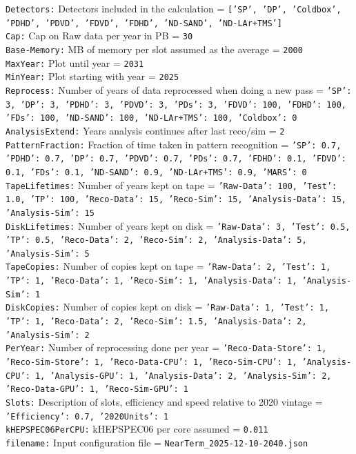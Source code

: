 {\tt Detectors:} Detectors included in the calculation = {\tt ['SP', 'DP', 'Coldbox', 'PDHD', 'PDVD', 'FDVD', 'FDHD', 'ND-SAND', 'ND-LAr+TMS']} \\
{\tt Cap:} Cap on Raw data per year in PB = {\tt 30} \\
{\tt Base-Memory:} MB of memory per slot assumed as the average = {\tt 2000} \\
{\tt MaxYear:} Plot until year = {\tt 2031} \\
{\tt MinYear:} Plot starting with year = {\tt 2025} \\
{\tt Reprocess:} Number of years of data reprocessed when doing a new pass = {\tt {'SP': 3, 'DP': 3, 'PDHD': 3, 'PDVD': 3, 'PDs': 3, 'FDVD': 100, 'FDHD': 100, 'FDs': 100, 'ND-SAND': 100, 'ND-LAr+TMS': 100, 'Coldbox': 0}} \\
{\tt AnalysisExtend:} Years analysis continues after last reco/sim = {\tt 2} \\
{\tt PatternFraction:} Fraction of time taken in pattern recognition = {\tt {'SP': 0.7, 'PDHD': 0.7, 'DP': 0.7, 'PDVD': 0.7, 'PDs': 0.7, 'FDHD': 0.1, 'FDVD': 0.1, 'FDs': 0.1, 'ND-SAND': 0.9, 'ND-LAr+TMS': 0.9, 'MARS': 0}} \\
{\tt TapeLifetimes:} Number of years kept on tape = {\tt {'Raw-Data': 100, 'Test': 1.0, 'TP': 100, 'Reco-Data': 15, 'Reco-Sim': 15, 'Analysis-Data': 15, 'Analysis-Sim': 15}} \\
{\tt DiskLifetimes:} Number of years kept on disk = {\tt {'Raw-Data': 3, 'Test': 0.5, 'TP': 0.5, 'Reco-Data': 2, 'Reco-Sim': 2, 'Analysis-Data': 5, 'Analysis-Sim': 5}} \\
{\tt TapeCopies:} Number of copies kept on tape = {\tt {'Raw-Data': 2, 'Test': 1, 'TP': 1, 'Reco-Data': 1, 'Reco-Sim': 1, 'Analysis-Data': 1, 'Analysis-Sim': 1}} \\
{\tt DiskCopies:} Number of copies kept on disk = {\tt {'Raw-Data': 1, 'Test': 1, 'TP': 1, 'Reco-Data': 2, 'Reco-Sim': 1.5, 'Analysis-Data': 2, 'Analysis-Sim': 2}} \\
{\tt PerYear:} Number of reprocessing done per year = {\tt {'Reco-Data-Store': 1, 'Reco-Sim-Store': 1, 'Reco-Data-CPU': 1, 'Reco-Sim-CPU': 1, 'Analysis-CPU': 1, 'Analysis-GPU': 1, 'Analysis-Data': 2, 'Analysis-Sim': 2, 'Reco-Data-GPU': 1, 'Reco-Sim-GPU': 1}} \\
{\tt Slots:} Description of slots, efficiency and speed relative to 2020 vintage = {\tt {'Efficiency': 0.7, '2020Units': 1}} \\
{\tt kHEPSPEC06PerCPU:} kHEPSPEC06 per core assumed = {\tt 0.011} \\
{\tt filename:} Input configuration file = {\tt NearTerm\_2025-12-10-2040.json} \\
